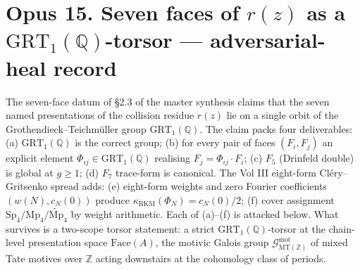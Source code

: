 \providecommand{\ClaimStatusTheorem}{\textsc{[Theorem]}}
\providecommand{\ClaimStatusScoped}{\textsc{[Scoped]}}
\providecommand{\ClaimStatusConjectured}{\textsc{[Conjectured]}}
\providecommand{\ClaimStatusHeuristic}{\textsc{[Heuristic]}}
\providecommand{\ClaimStatusRetracted}{\textsc{[Retracted]}}
\providecommand{\ClaimStatusDefinition}{\textsc{[Definition]}}
\providecommand{\ZZ}{\mathbb{Z}}
\providecommand{\QQ}{\mathbb{Q}}
\providecommand{\CC}{\mathbb{C}}
\providecommand{\RR}{\mathbb{R}}
\providecommand{\fg}{\mathfrak{g}}
\providecommand{\grt}{\mathfrak{grt}_1}
\providecommand{\GRT}{\mathrm{GRT}_1}
\providecommand{\GT}{\mathrm{GT}_1}
\providecommand{\MT}{\mathrm{MT}}
\providecommand{\Conf}{\mathrm{Conf}}
\providecommand{\Ran}{\mathrm{Ran}}
\providecommand{\FM}{\mathrm{FM}}
\providecommand{\KZ}{\mathrm{KZ}}
\providecommand{\KZB}{\mathrm{KZB}}
\providecommand{\MC}{\mathrm{MC}}
\providecommand{\Res}{\operatorname{Res}}
\providecommand{\coll}{\mathrm{coll}}
\providecommand{\Moduli}{\overline{M}}
\providecommand{\Face}{\mathrm{Face}}
\providecommand{\MZV}{\mathrm{MZV}}
\providecommand{\Gal}{\mathrm{Gal}}
\providecommand{\Sp}{\mathrm{Sp}}
\providecommand{\Mp}{\mathrm{Mp}}
\providecommand{\Mptilde}{\widetilde{\Mp}}
\providecommand{\Gmot}{\mathcal{G}^{\mathrm{mot}}}
\providecommand{\Zmot}{\mathcal{Z}^{\mathrm{mot}}}

\section*{Opus 15. Seven faces of \texorpdfstring{$r(z)$}{r(z)} as a
\texorpdfstring{$\GRT(\QQ)$}{GRT-1(Q)}-torsor --- adversarial-heal record}

The seven-face datum of §2.3 of the master synthesis claims that the
seven named presentations of the collision residue $r(z)$ lie on a
single orbit of the Grothendieck--Teichm\"uller group $\GRT(\QQ)$. The
claim packs four deliverables: (a) $\GRT(\QQ)$ is the correct group;
(b) for every pair of faces $(F_i, F_j)$ an explicit element
$\Phi_{ij} \in \GRT(\QQ)$ realising $F_j = \Phi_{ij} \cdot F_i$;
(c) $F_5$ (Drinfeld double) is global at $g \ge 1$; (d) $F_7$
trace-form is canonical. The Vol III eight-form Cl\'ery--Gritsenko
spread adds: (e) eight-form weights and zero Fourier coefficients
$(w(N), c_N(0))$ produce $\kappa_{\mathrm{BKM}}(\Phi_N) = c_N(0)/2$;
(f) cover assignment $\Sp_4 / \Mp_4 / \Mptilde_4$ by weight
arithmetic. Each of (a)--(f) is attacked below. What survives is a
two-scope torsor statement: a strict $\GRT(\QQ)$-torsor at the
chain-level presentation space $\Face(A)$, the motivic Galois group
$\Gmot_{\mathrm{MT}(\ZZ)}$ of mixed Tate motives over $\ZZ$ acting
downstairs at the cohomology class of periods.

